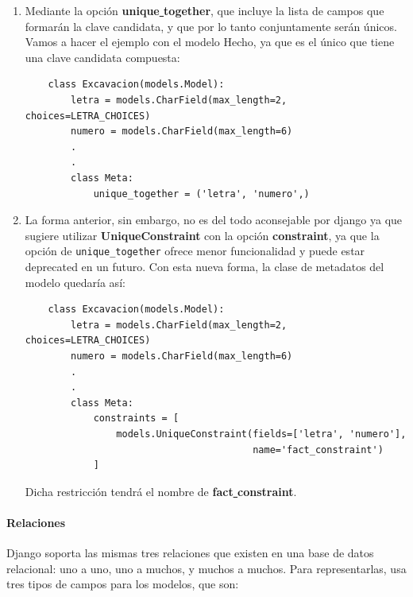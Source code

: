     \begin{enumerate}
        \item Mediante la opción \textbf{unique\underline{ }together}, que incluye la lista
        de campos que formarán la clave candidata, y que por lo tanto conjuntamente serán
        únicos. Vamos a hacer el ejemplo con el modelo Hecho, ya que es el único que tiene
        una clave candidata compuesta:
        
    \begin{verbatim}
    class Excavacion(models.Model):
        letra = models.CharField(max_length=2, choices=LETRA_CHOICES)
        numero = models.CharField(max_length=6)    
        .
        .
        class Meta:
            unique_together = ('letra', 'numero',)
    \end{verbatim}

        \item La forma anterior, sin embargo, no es del todo aconsejable por django ya
        que sugiere utilizar \textbf{UniqueConstraint} con la opción \textbf{constraint},
        ya que la opción de \verb|unique_together| ofrece menor funcionalidad y puede
        estar deprecated en un futuro. Con esta nueva forma, la clase de metadatos
        del modelo quedaría así:
        
    \begin{verbatim}
    class Excavacion(models.Model):
        letra = models.CharField(max_length=2, choices=LETRA_CHOICES)
        numero = models.CharField(max_length=6)    
        .
        .
        class Meta:
            constraints = [
                models.UniqueConstraint(fields=['letra', 'numero'], 
                                        name='fact_constraint')                                                  
            ]
    \end{verbatim}

    Dicha restricción tendrá el nombre de \textbf{fact\underline{ }constraint}.
    \end{enumerate}

    \paragraph{Relaciones} \underline{}
    \newline Django soporta las mismas tres relaciones que existen en una base de datos relacional:
    uno a uno, uno a muchos, y muchos a muchos. Para representarlas, usa tres tipos de campos
    para los modelos, que son:

